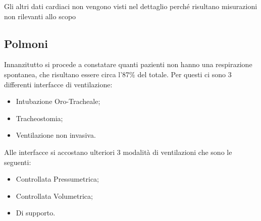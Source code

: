 Gli altri dati cardiaci non vengono visti nel dettaglio perché risultano misurazioni non rilevanti allo scopo \\


\subsection{Polmoni}

Innanzitutto si procede a constatare quanti pazienti non hanno una respirazione spontanea, che risultano essere circa l'87\% del totale. Per questi ci sono 3 differenti interfacce di ventilazione:
\begin{itemize}
	\item Intubazione Oro-Tracheale;
	\item Tracheostomia;
	\item Ventilazione non invasiva.
\end{itemize}

Alle interfacce si accostano ulteriori 3 modalità di ventilazioni che sono le seguenti:

\begin{itemize}
	\item Controllata Pressumetrica;
	\item Controllata Volumetrica;
	\item Di supporto.
\end{itemize}

